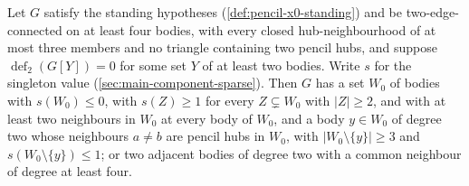 \begin{lemma}
  \label{lem:pencil-rigid-good-ear}
  \leanok
  Let $G$ satisfy the standing hypotheses (\cref{def:pencil-x0-standing})
  and be two-edge-connected on at least four bodies, with every closed
  hub-neighbourhood of at most three members and no triangle containing
  two pencil hubs, and suppose $\operatorname{def}_2(G[Y]) = 0$ for some
  set $Y$ of at least two bodies. Write $s$ for the singleton value
  (\cref{sec:main-component-sparse}). Then $G$ has a set $W_0$ of bodies
  with $s(W_0) \le 0$, with $s(Z) \ge 1$ for every $Z \subsetneq W_0$ with
  $|Z| \ge 2$, and with at least two neighbours in $W_0$ at every body of
  $W_0$, and a body $y \in W_0$ of degree two whose neighbours $a \ne b$
  are pencil hubs in $W_0$, with $|W_0 \setminus \{y\}| \ge 3$ and
  $s(W_0 \setminus \{y\}) \le 1$; or two adjacent bodies of degree two
  with a common neighbour of degree at least four.
\end{lemma}

